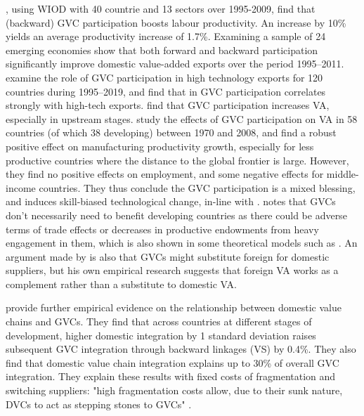 \documentclass[a4paper]{article}
\begin{document}
\citet{constantinescu2019does}, using WIOD with 40 countrie and 13 sectors over 1995-2009, find that (backward) GVC participation boosts labour productivity. An increase by 10\% yields an average productivity increase of 1.7\%. Examining a sample of 24 emerging economies \citet{jangam2021does} show that both forward and backward participation significantly improve domestic value-added exports over the period 1995–2011. \citet{altun2023does} examine the role of GVC participation in high technology exports for 120 countries during 1995–2019, and find that in GVC participation correlates strongly with high-tech exports. \citet{kummritz2017economic} find that GVC participation increases VA, especially in upstream stages. \citet{pahl2020global} study the effects of GVC participation on VA in 58 countries (of which 38 developing) between 1970 and 2008, and find a robust positive effect on manufacturing productivity growth, especially for less productive countries where the distance to the global frontier is large. However, they find no positive effects on employment, and some negative effects for middle-income countries. They thus conclude the GVC participation is a mixed blessing, and induces skill-biased technological change, in-line with \citet{rodrik2018new}. \citet{Kummritz20161} notes that GVCs don't necessarily need to benefit developing countries as there could be adverse terms of trade effects or decreases in productive endowments from heavy engagement in them, which is also shown in some theoretical models such as \citet{baldwin2014trade}. An argument made by \citet{kummritz2015global} is also that GVCs might substitute foreign for domestic suppliers, but his own empirical research suggests that foreign VA works as a complement rather than a substitute to domestic VA. \newline %
 
 \citet{beverelli2019domestic} provide further empirical evidence on the relationship between domestic value chains and GVCs. They find that across countries at different stages of development, higher domestic integration by 1 standard deviation raises subsequent GVC integration through backward linkages (VS) by 0.4\%. They also find that domestic value chain integration explains up to 30\% of overall GVC integration. They explain these results with fixed costs of fragmentation and switching suppliers: "high fragmentation costs allow, due to their sunk nature, DVCs to act as stepping stones to GVCs" \citep{beverelli2019domestic}. \newline %
\end{document}
